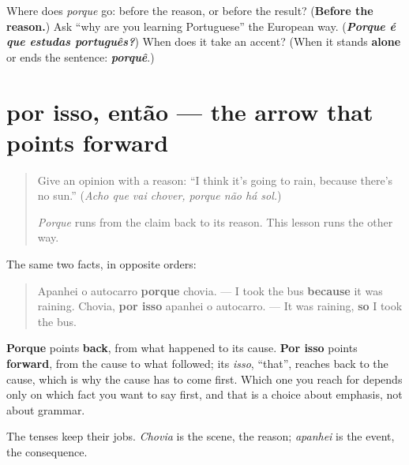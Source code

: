\begin{tcolorbox}[breakable,colback=teal!4,colframe=teal!35!black,title={Before you move on}]
Where does \emph{porque} go: before the reason, or before the result? (\textbf{Before the reason.}) Ask \textquotedblleft{}why are you learning Portuguese\textquotedblright{} the European way. (\emph{\textbf{Porque é que estudas português?}}) When does it take an accent? (When it stands \textbf{alone} or ends the sentence: \emph{\textbf{porquê}}.)
\end{tcolorbox}
\section[por isso, então]{por isso, então — the arrow that points forward}

\label{lesson:PT-C261-por-isso}



\begin{quote}
Give an opinion with a reason: \textquotedblleft{}I think it's going to rain, because there's no sun.\textquotedblright{} (\emph{Acho que vai chover, porque não há sol.})

\emph{Porque} runs from the claim back to its reason. This lesson runs the other way.
\end{quote}

\begin{grammarlens}[title={Grammar Lens: the two arrows}]
The same two facts, in opposite orders:

\begin{quote}
Apanhei o autocarro \textbf{porque} chovia. — I took the bus \textbf{because} it was raining. Chovia, \textbf{por isso} apanhei o autocarro. — It was raining, \textbf{so} I took the bus.
\end{quote}

\textbf{Porque} points \textbf{back}, from what happened to its cause. \textbf{Por isso} points \textbf{forward}, from the cause to what followed; its \emph{isso}, \textquotedblleft{}that\textquotedblright{}, reaches back to the cause, which is why the cause has to come first. Which one you reach for depends only on which fact you want to say first, and that is a choice about emphasis, not about grammar.

The tenses keep their jobs. \emph{Chovia} is the scene, the reason; \emph{apanhei} is the event, the consequence.
\end{grammarlens}

